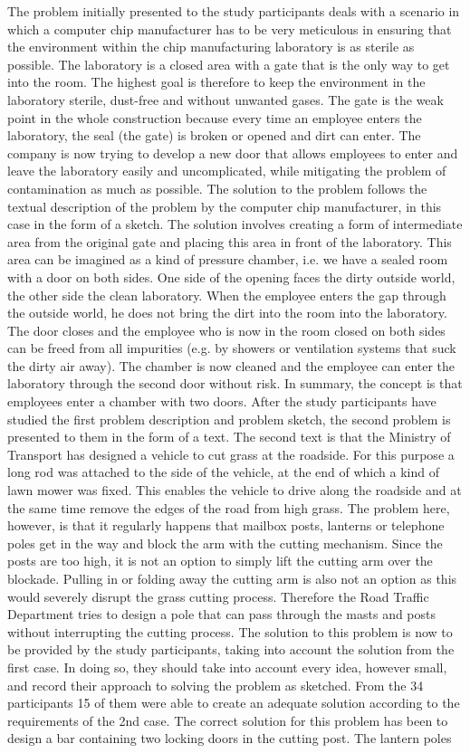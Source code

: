 \documentclass[12pt]{article}
\begin{document}
The problem initially presented to the study participants deals with a scenario in which a computer chip manufacturer has to be very meticulous in ensuring that the environment within the chip manufacturing laboratory is as sterile as possible. The laboratory is a closed area with a gate that is the only way to get into the room. The highest goal is therefore to keep the environment in the laboratory sterile, dust-free and without unwanted gases. The gate is the weak point in the whole construction because every time an employee enters the laboratory, the seal (the gate) is broken or opened and dirt can enter. The company is now trying to develop a new door that allows employees to enter and leave the laboratory easily and uncomplicated, while mitigating the problem of contamination as much as possible. The solution to the problem follows the textual description of the problem by the computer chip manufacturer, in this case in the form of a sketch. The solution involves creating a form of intermediate area from the original gate and placing this area in front of the laboratory. This area can be imagined as a kind of pressure chamber, i.e. we have a sealed room with a door on both sides. One side of the opening faces the dirty outside world, the other side the clean laboratory. When the employee enters the gap through the outside world, he does not bring the dirt into the room into the laboratory. The door closes and the employee who is now in the room closed on both sides can be freed from all impurities (e.g. by showers or ventilation systems that suck the dirty air away). The chamber is now cleaned and the employee can enter the laboratory through the second door without risk. In summary, the concept is that employees enter a chamber with two doors. After the study participants have studied the first problem description and problem sketch, the second problem is presented to them in the form of a text. The second text is that the Ministry of Transport has designed a vehicle to cut grass at the roadside. For this purpose a long rod was attached to the side of the vehicle, at the end of which a kind of lawn mower was fixed. This enables the vehicle to drive along the roadside and at the same time remove the edges of the road from high grass. The problem here, however, is that it regularly happens that mailbox posts, lanterns or telephone poles get in the way and block the arm with the cutting mechanism. Since the posts are too high, it is not an option to simply lift the cutting arm over the blockade. Pulling in or folding away the cutting arm is also not an option as this would severely disrupt the grass cutting process. Therefore the Road Traffic Department tries to design a pole that can pass through the masts and posts without interrupting the cutting process. The solution to this problem is now to be provided by the study participants, taking into account the solution from the first case. In doing so, they should take into account every idea, however small, and record their approach to solving the problem as sketched.  From the 34 participants 15 of them were able to create an adequate solution according to the requirements of the 2nd case. The correct solution for this problem has been to design a bar containing two locking doors in the cutting post. The lantern poles 
\end{document}
